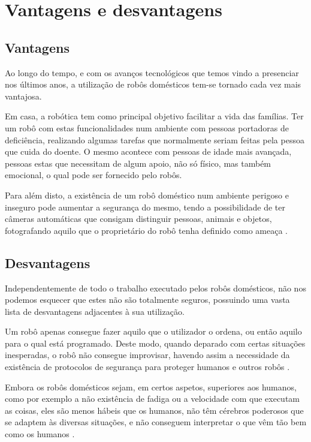 \documentclass[10pt]{article}
\begin{document}
\section{Vantagens e desvantagens}


\subsection{Vantagens}
\hspace{\parindent}Ao longo do tempo, e com os avanços tecnológicos que temos vindo a presenciar nos últimos anos, a utilização de robôs domésticos tem-se tornado cada vez mais vantajosa.

Em casa, a robótica tem como principal objetivo facilitar a vida das famílias. Ter um robô com estas funcionalidades num ambiente com pessoas portadoras de deficiência, realizando algumas tarefas que normalmente seriam feitas pela pessoa que cuida do doente. O mesmo acontece com pessoas de idade mais avançada, pessoas estas que necessitam de algum apoio, não só físico, mas também emocional, o qual pode ser fornecido pelo robôs.

Para além disto, a existência de um robô doméstico num ambiente perigoso e inseguro pode aumentar a segurança do mesmo, tendo a possibilidade de ter câmeras automáticas que consigam distinguir pessoas, animais e objetos, fotografando aquilo que o proprietário do robô tenha definido como ameaça \cite{advantages1}.

\subsection{Desvantagens}
\hspace{\parindent}Independentemente de todo o trabalho executado pelos robôs domésticos, não nos podemos esquecer que estes não são totalmente seguros, possuindo uma vasta lista de desvantagens adjacentes à sua utilização.

Um robô apenas consegue fazer aquilo que o utilizador o ordena, ou então aquilo para o qual está programado. Deste modo, quando deparado com certas situações inesperadas, o robô não consegue improvisar, havendo assim a necessidade da existência de protocolos de segurança para proteger humanos e outros robôs \cite{advantages1}.

Embora os robôs domésticos sejam, em certos aspetos, superiores aos humanos, como por exemplo a não existência de fadiga ou a velocidade com que executam as coisas, eles são menos hábeis que os humanos, não têm cérebros poderosos que se adaptem às diversas situações, e não conseguem interpretar o que vêm tão bem como os humanos \cite{advantages2}.
\end{document}
